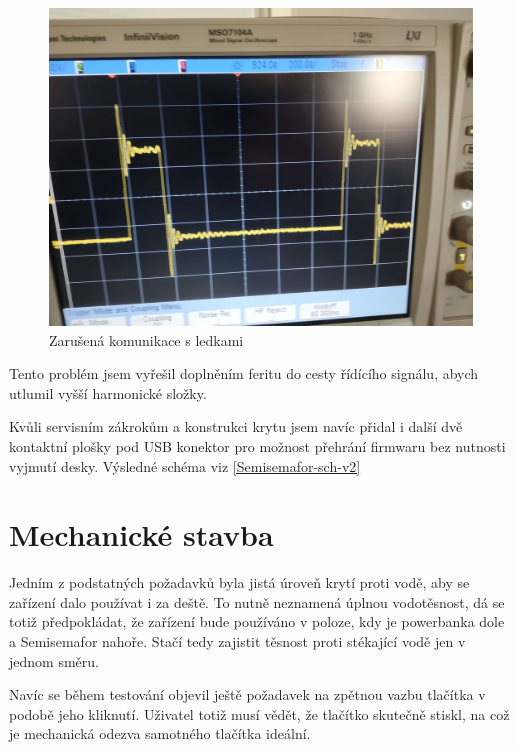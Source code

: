 \begin{figure}[!h]
  \begin{center}
    \includegraphics[width=\textwidth]{text/PraktickaCast/img/trampolina.jpg}
  \end{center}
  \label{Semisemafor-zvonek}
  \caption{Zarušená komunikace s ledkami}
\end{figure}

Tento problém jsem vyřešil doplněním feritu do cesty řídícího signálu, abych utlumil vyšší harmonické složky.

Kvůli servisním zákrokům a konstrukci krytu jsem navíc přidal i další dvě kontaktní plošky pod USB konektor pro možnost přehrání firmwaru bez nutnosti vyjmutí desky.
Výsledné schéma viz \ref{Semisemafor-sch-v2}

\section{Mechanické stavba}
Jedním z podstatných požadavků byla jistá úroveň krytí proti vodě, aby se zařízení dalo používat i za deště.
To nutně neznamená úplnou vodotěsnost, dá se totiž předpokládat, že zařízení bude používáno v poloze, kdy je powerbanka dole a Semisemafor nahoře.
Stačí tedy zajistit těsnost proti stékající vodě jen v jednom směru.

Navíc se během testování objevil ještě požadavek na zpětnou vazbu tlačítka v podobě jeho kliknutí. 
Uživatel totiž musí vědět, že tlačítko skutečně stiskl, na což je mechanická odezva samotného tlačítka ideální.

